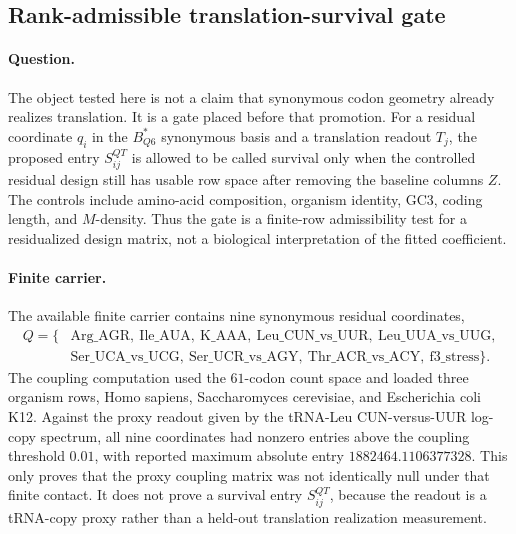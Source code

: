 \subsection{Rank-admissible translation-survival gate}
\label{sec:q6-rank-admissible-translation-survival-gate-cross-layer}

\paragraph{Question.}
The object tested here is not a claim that synonymous codon geometry already realizes translation.  It is a gate placed before that promotion.  For a residual coordinate $q_i$ in the $B^\ast_{Q6}$ synonymous basis and a translation readout $T_j$, the proposed entry $S^{QT}_{ij}$ is allowed to be called survival only when the controlled residual design still has usable row space after removing the baseline columns $Z$.  The controls include amino-acid composition, organism identity, GC3, coding length, and $M$-density.  Thus the gate is a finite-row admissibility test for a residualized design matrix, not a biological interpretation of the fitted coefficient.

\paragraph{Finite carrier.}
The available finite carrier contains nine synonymous residual coordinates,
$$
\begin{aligned}
Q = \{&\mathrm{Arg\_AGR},\ \mathrm{Ile\_AUA},\ \mathrm{K\_AAA},\ \mathrm{Leu\_CUN\_vs\_UUR},\ \mathrm{Leu\_UUA\_vs\_UUG},\\
&\mathrm{Ser\_UCA\_vs\_UCG},\ \mathrm{Ser\_UCR\_vs\_AGY},\ \mathrm{Thr\_ACR\_vs\_ACY},\ \mathrm{f3\_stress}\}.
\end{aligned}
$$
The coupling computation used the $61$-codon count space and loaded three organism rows, Homo sapiens, Saccharomyces cerevisiae, and Escherichia coli K12.  Against the proxy readout given by the tRNA-Leu CUN-versus-UUR log-copy spectrum, all nine coordinates had nonzero entries above the coupling threshold $0.01$, with reported maximum absolute entry $1882464.1106377328$.  This only proves that the proxy coupling matrix was not identically null under that finite contact.  It does not prove a survival entry $S^{QT}_{ij}$, because the readout is a tRNA-copy proxy rather than a held-out translation realization measurement.

